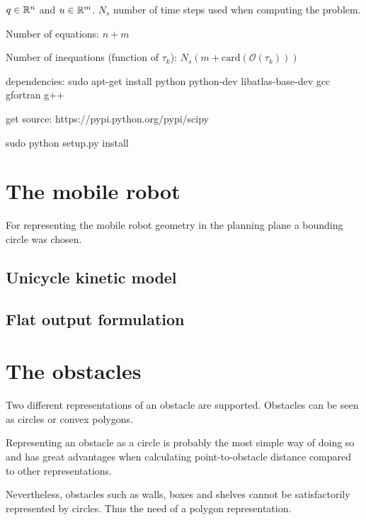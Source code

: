 $q \in \mathbb{R}^n$ and $u \in \mathbb{R}^m$. $N_s$ number of time steps used when computing the problem.

Number of equations: $n + m$

Number of inequations (function of $\tau_k$): $N_s(m+\mathrm{card}(\mathcal{O}(\tau_k)))$

dependencies:
sudo apt-get install python python-dev libatlas-base-dev gcc gfortran g++

get source:
https://pypi.python.org/pypi/scipy

sudo python setup.py install

\section{The mobile robot}

For representing the mobile robot geometry in the planning plane a bounding circle was chosen.

\subsection{Unicycle kinetic model}

\subsection{Flat output formulation}
\pagebreak
\section{The obstacles}


Two different representations of an obstacle are supported. Obstacles can be seen as circles or convex polygons.

Representing an obstacle as a circle is probably the most simple way of doing so and has great advantages when
calculating point-to-obstacle distance compared to other representations.

Nevertheless, obstacles such as walls, boxes and shelves cannot be satisfactorily represented by circles.
Thus the need of a polygon representation.


